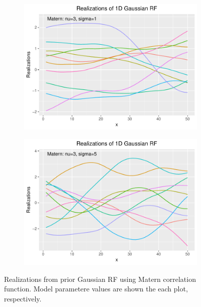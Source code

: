 \begin{figure}[]
     \begin{subfigure}[H]{0.49\textwidth}
        \centering
        \includegraphics[scale=0.5,trim=0cm 0cm 0cm 0cm]{figures/sample1conf7.pdf}
    \end{subfigure}
    \hfill
    \begin{subfigure}[H]{0.49\textwidth}  
        \centering 
        \includegraphics[scale=0.5,trim=0cm 0cm 0cm 0cm]{figures/sample1conf8.pdf}
    \end{subfigure}

    \caption{Realizations from prior Gaussian RF using Matern correlation function. Model parametere values are shown the each plot, respectively.}
    \label{fig:prior_samp_matern}
\end{figure}

